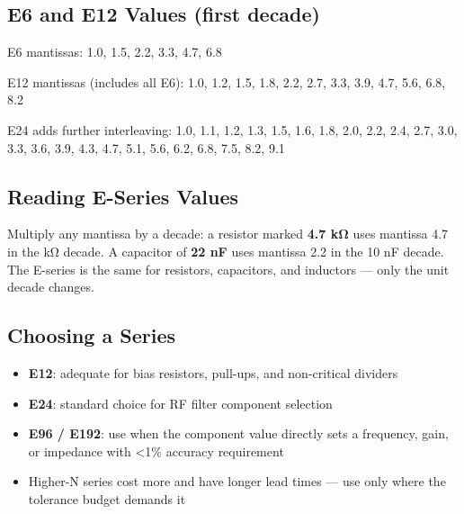 				

\subsection{E6 and E12 Values (first decade)}

				

E6 mantissas: 1.0, 1.5, 2.2, 3.3, 4.7, 6.8

				

E12 mantissas (includes all E6): 1.0, 1.2, 1.5, 1.8, 2.2, 2.7, 3.3, 3.9, 4.7, 5.6, 6.8, 8.2

				

E24 adds further interleaving: 1.0, 1.1, 1.2, 1.3, 1.5, 1.6, 1.8, 2.0, 2.2, 2.4, 2.7, 3.0, 3.3, 3.6, 3.9, 4.3, 4.7, 5.1, 5.6, 6.2, 6.8, 7.5, 8.2, 9.1

				

\subsection{Reading E-Series Values}

				

Multiply any mantissa by a decade: a resistor marked \textbf{4.7 kΩ} uses mantissa 4.7 in the kΩ decade. A capacitor of \textbf{22 nF} uses mantissa 2.2 in the 10 nF decade. The E-series is the same for resistors, capacitors, and inductors — only the unit decade changes.

				


				

\subsection{Choosing a Series}

				
\begin{itemize}

					\item \textbf{E12}: adequate for bias resistors, pull-ups, and non-critical dividers

					\item \textbf{E24}: standard choice for RF filter component selection

					\item \textbf{E96 / E192}: use when the component value directly sets a frequency, gain, or impedance with \textless{}1\% accuracy requirement

					\item Higher-N series cost more and have longer lead times — use only where the tolerance budget demands it

				
\end{itemize}

